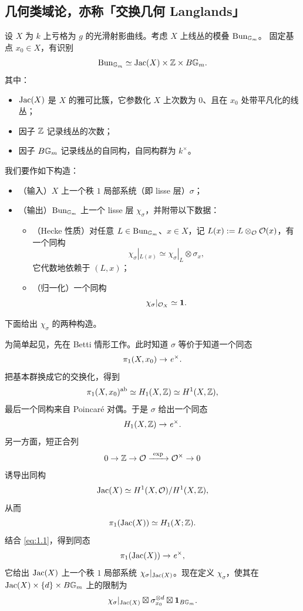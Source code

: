 \subsection{几何类域论，亦称「交换几何 Langlands」}

设 \(X\) 为 \(k\) 上亏格为 \(g\) 的光滑射影曲线。考虑 \(X\) 上线丛的模叠 \(\operatorname{Bun}_{\mathbb{G}_m}\)。
固定基点 \(x_0\in X\)，有识别
\[
\operatorname{Bun}_{\mathbb{G}_m}\simeq\operatorname{Jac}(X)\times\mathbb{Z}\times B\mathbb{G}_m.
\]
其中：

\begin{itemize}
\item \(\operatorname{Jac}(X)\) 是 \(X\) 的雅可比簇，它参数化 \(X\) 上次数为 \(0\)、且在 \(x_0\) 处带平凡化的线丛；
\item 因子 \(\mathbb{Z}\) 记录线丛的次数；
\item 因子 \(B\mathbb{G}_m\) 记录线丛的自同构，自同构群为 \(k^\times\)。
\end{itemize}

\begin{goal}\label{goal:gl1}
我们要作如下构造：

\begin{itemize}
\item （输入）\(X\) 上一个秩 \(1\) 局部系统（即 lisse 层）\(\sigma\)；
\item （输出）\(\operatorname{Bun}_{\mathbb{G}_m}\) 上一个 lisse 层 \(\chi_\sigma\)，并附带以下数据：
\begin{itemize}
\item （Hecke 性质）对任意 \(L\in\operatorname{Bun}_{\mathbb{G}_m}\)、\(x\in X\)，记 \(L(x):=L\otimes_{\mathcal{O}}\mathcal{O}(x)\)，有一个同构
\[
\chi_\sigma|_{L(x)}\simeq\chi_\sigma|_L\otimes\sigma_x,
\]
它代数地依赖于 \((L,x)\)；
\item （归一化）一个同构
\[
\chi_\sigma|_{\mathcal{O}_X}\simeq\mathbf{1}.
\]
\end{itemize}
\end{itemize}
\end{goal}

下面给出 \(\chi_\sigma\) 的两种构造。

\begin{construction}\label{con:gl1-betti}
为简单起见，先在 Betti 情形工作。此时知道 \(\sigma\) 等价于知道一个同态
\[
\pi_1(X,x_0)\to\mathit{e}^\times.
\]
把基本群换成它的交换化，得到
\[
\pi_1(X,x_0)^{\mathrm{ab}}\simeq H_1(X,\mathbb{Z})\simeq H^1(X,\mathbb{Z}),
\]
最后一个同构来自 Poincaré 对偶。于是 \(\sigma\) 给出一个同态
\begin{equation}\label{eq:1.1}
H_1(X,\mathbb{Z})\to\mathit{e}^\times.
\end{equation}
另一方面，短正合列
\[
0\to\mathbb{Z}\to\mathcal{O}\xrightarrow{\ \exp\ }\mathcal{O}^\times\to 0
\]
诱导出同构
\[
\operatorname{Jac}(X)\simeq H^1(X,\mathcal{O})/H^1(X,\mathbb{Z}),
\]
从而
\[
\pi_1(\operatorname{Jac}(X))\simeq H_1(X;\mathbb{Z}).
\]
结合 \eqref{eq:1.1}，得到同态
\[
\pi_1(\operatorname{Jac}(X))\to\mathit{e}^\times,
\]
它给出 \(\operatorname{Jac}(X)\) 上一个秩 \(1\) 局部系统 \(\chi_\sigma|_{\operatorname{Jac}(X)}\)。现在定义 \(\chi_\sigma\)，使其在
\(\operatorname{Jac}(X)\times\{d\}\times B\mathbb{G}_m\) 上的限制为
\[
\chi_\sigma|_{\operatorname{Jac}(X)}\boxtimes\sigma_{x_0}^{\otimes d}\boxtimes\mathbf{1}_{B\mathbb{G}_m}.
\]
\end{construction}

